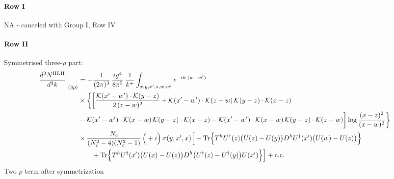 \documentclass[9pt]{article}
\numberwithin{equation}{section}
\begin{document}
\paragraph*{Row I}
\textsc{NA} - canceled with Group I, Row IV
\paragraph*{Row II}
Symmetrised three-$\rho$ part:
\begin{align}
\frac{d^{3}N^{\rm III.II}}{d^{3}k}\bigg|_{(3\rho)}&=-\frac{1}{(2\pi)^{3}}\,\frac{ig^{4}}{8\pi^{5}}\,\frac{1}{k^{+}}\int_{x,y,x',z,w,w'}e^{-ik\cdot(w-w')}\notag\\
&\times\bigg\{\bigg[\frac{\mathcal{K}(x'-w')\cdot\mathcal{K}(y-z)}{2\,(z-w)^{2}}+\mathcal{K}(x'-w')\cdot\mathcal{K}(z-w)\,\mathcal{K}(y-z)\cdot\mathcal{K}(x-z)\notag\\
&-\mathcal{K}(x'-w')\cdot\mathcal{K}(x-w)\,\mathcal{K}(y-z)\cdot\mathcal{K}(x-z)-\mathcal{K}(x'-w')\cdot\mathcal{K}(x-w)\,\mathcal{K}(y-z)\cdot\mathcal{K}(z-w)\bigg]\log\frac{(x-z)^{2}}{(x-w)^{2}}\bigg\}\notag\\
&\times \frac{N_{c}}{(N_{c}^{2}-4)(N_{c}^{2}-1)}\,\Big(+i\Big)\,\sigma(y,x',x)\Big[-{\rm Tr}\Big\{T^{h}U^{\dagger}(z)\big(U(z)-U(y)\big)D^{h}U^{\dagger}(x')\big(U(w)-U(z)\big)\Big\}\notag\\&\qquad+{\rm Tr}\Big\{T^{h}U^{\dagger}(x')\big(U(x)-U(z)\big)D^{h}\big(U^{\dagger}(z)-U^{\dagger}(y)\big)U(x')\Big\}\Big]+{\rm c.c.}\label{eq:S-III.II-3}
\end{align}
Two $\rho$ term after symmetrization
\end{document}
